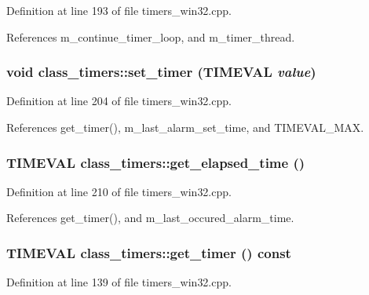 Definition at line 193 of file timers\_\-win32.cpp.

References m\_\-continue\_\-timer\_\-loop, and m\_\-timer\_\-thread.\hypertarget{classclass__timers_a27df6346a38fb25acc394cb7998a3f8}{
\subsubsection[set\_\-timer]{\setlength{\rightskip}{0pt plus 5cm}void class\_\-timers::set\_\-timer (TIMEVAL {\em value})}}
\label{classclass__timers_a27df6346a38fb25acc394cb7998a3f8}




Definition at line 204 of file timers\_\-win32.cpp.

References get\_\-timer(), m\_\-last\_\-alarm\_\-set\_\-time, and TIMEVAL\_\-MAX.\hypertarget{classclass__timers_0fa5bd5d1d4012bf9eef3ffabe990dfb}{
\subsubsection[get\_\-elapsed\_\-time]{\setlength{\rightskip}{0pt plus 5cm}TIMEVAL class\_\-timers::get\_\-elapsed\_\-time ()}}
\label{classclass__timers_0fa5bd5d1d4012bf9eef3ffabe990dfb}




Definition at line 210 of file timers\_\-win32.cpp.

References get\_\-timer(), and m\_\-last\_\-occured\_\-alarm\_\-time.\hypertarget{classclass__timers_e4fe19b5b56b72ce2601d74f6519bd0b}{
\subsubsection[get\_\-timer]{\setlength{\rightskip}{0pt plus 5cm}TIMEVAL class\_\-timers::get\_\-timer () const}}
\label{classclass__timers_e4fe19b5b56b72ce2601d74f6519bd0b}




Definition at line 139 of file timers\_\-win32.cpp.

